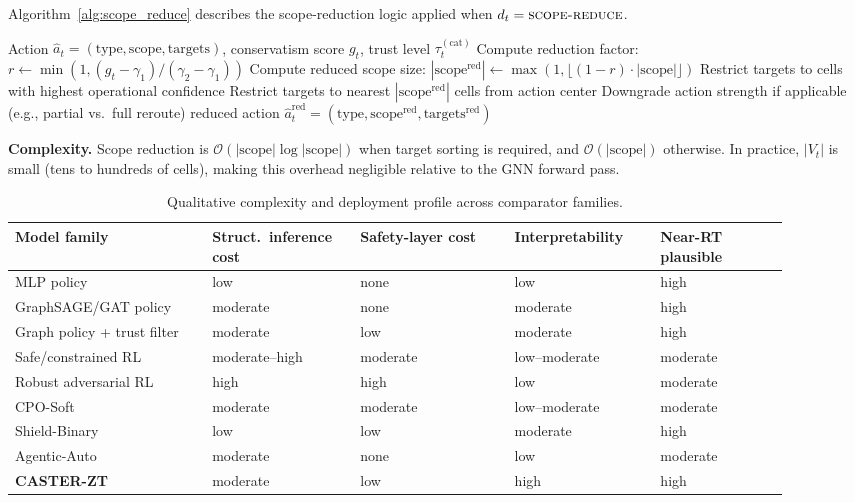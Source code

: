 \documentclass[10pt,journal,compsoc]{IEEEtran}
\begin{document}
Algorithm~\ref{alg:scope_reduce} describes the scope-reduction logic applied when $d_t = \textsc{scope-reduce}$.

\begin{algorithm}[t]
\caption{Scope-reduction enforcement}
\label{alg:scope_reduce}
\begin{algorithmic}[1]
\Require Action $\hat{a}_t = (\mathrm{type}, \mathrm{scope}, \mathrm{targets})$, conservatism score $g_t$, trust level $\tau_t^{(\mathrm{cat})}$
\State Compute reduction factor: $r \gets \min(1, (g_t - \gamma_1)/(\gamma_2 - \gamma_1))$ 
\State Compute reduced scope size: $|\mathrm{scope}^{\mathrm{red}}| \gets \max(1, \lfloor (1-r) \cdot |\mathrm{scope}| \rfloor)$
    \State Restrict targets to cells with highest operational confidence
\Else
    \State Restrict targets to nearest $|\mathrm{scope}^{\mathrm{red}}|$ cells from action center
\EndIf
\State Downgrade action strength if applicable (e.g., partial vs.\ full reroute)
\State \Return reduced action $\hat{a}_t^{\mathrm{red}} = (\mathrm{type}, \mathrm{scope}^{\mathrm{red}}, \mathrm{targets}^{\mathrm{red}})$
\end{algorithmic}
\end{algorithm}

\noindent\textbf{Complexity.}
Scope reduction is $\mathcal{O}(|\mathrm{scope}| \log |\mathrm{scope}|)$ when target sorting is required, and $\mathcal{O}(|\mathrm{scope}|)$ otherwise.
In practice, $|V_t|$ is small (tens to hundreds of cells), making this overhead negligible relative to the GNN forward pass.

\begin{table}[t]
\centering
\caption{Qualitative complexity and deployment profile across comparator families.}
\label{tab:complexity_profile}
\begin{tabular}{p{0.23\linewidth}p{0.17\linewidth}p{0.18\linewidth}p{0.17\linewidth}p{0.15\linewidth}}
\toprule
Model family & Struct.\ inference cost & Safety-layer cost & Interpretability & Near-RT plausible \\
\midrule
MLP policy & low & none & low & high \\
GraphSAGE/GAT policy & moderate & none & moderate & high \\
Graph policy + trust filter & moderate & low & moderate & high \\
Safe/constrained RL & moderate--high & moderate & low--moderate & moderate \\
Robust adversarial RL & high & high & low & moderate \\
CPO-Soft~\cite{achiam2017cpo} & moderate & moderate & low--moderate & moderate \\
Shield-Binary~\cite{alshiekh2018shielding} & low & low & moderate & high \\
Agentic-Auto~\cite{toward_autonomous_oran_2026} & moderate & none & low & moderate \\
\textbf{CASTER-ZT} & moderate & low & high & high \\
\bottomrule
\end{tabular}
\end{table}
\end{document}
